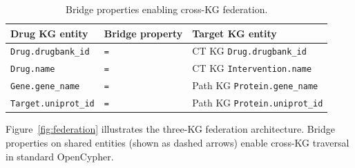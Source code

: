 \documentclass[sigconf]{acmart}
\begin{document}
\begin{table}[t]
\centering
\caption{Bridge properties enabling cross-KG federation.}
\label{tab:bridges}
\small
\begin{tabular}{@{}lll@{}}
\toprule
\textbf{Drug KG entity} & \textbf{Bridge property} & \textbf{Target KG entity} \\
\midrule
\texttt{Drug.drugbank\_id}  & \texttt{=} & CT KG \texttt{Drug.drugbank\_id} \\
\texttt{Drug.name}          & \texttt{=} & CT KG \texttt{Intervention.name} \\
\texttt{Gene.gene\_name}    & \texttt{=} & Path KG \texttt{Protein.gene\_name} \\
\texttt{Target.uniprot\_id} & \texttt{=} & Path KG \texttt{Protein.uniprot\_id} \\
\bottomrule
\end{tabular}
\end{table}

Figure~\ref{fig:federation} illustrates the three-KG federation
architecture.  Bridge properties on shared entities (shown as dashed
arrows) enable cross-KG traversal in standard OpenCypher.
\end{document}
